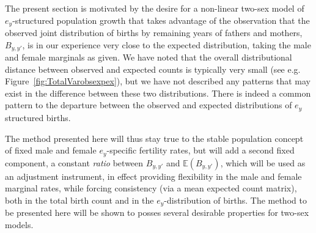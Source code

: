 
The present section is motivated by the desire for a non-linear two-sex model of
$e_y$-structured population growth that takes advantage of the observation that
the observed joint distribution of births by remaining years of fathers 
and mothers, $B_{y,y'}$, is in our experience very close to the expected
distribution, taking the male and female marginals as given. We have noted 
that the overall distributional distance
between observed and expected counts is typically very small (see e.g.
Figure~\ref{fig:TotalVarobsexpex}), but we have not described any patterns that
may exist in the difference between these two distributions. There is indeed a
common pattern to the departure between the observed and expected distributions
of $e_y$ structured births.  

The method presented here will thus stay true to the stable population concept
 of fixed male and female $e_y$-specific fertility rates, but will add a second
 fixed component, a constant \textit{ratio} between $B_{y,y'}$ and
 $\mathbb{E}(B_{y,y'})$, which will be used as an adjustment instrument, in
 effect providing flexibility in the male and female marginal rates, while forcing
 consistency (via a mean expected count matrix), both in the total birth count
 and in the $e_y$-distribution of births. The method to be presented here will be shown to posses
 several desirable properties for two-sex models.
 
 



